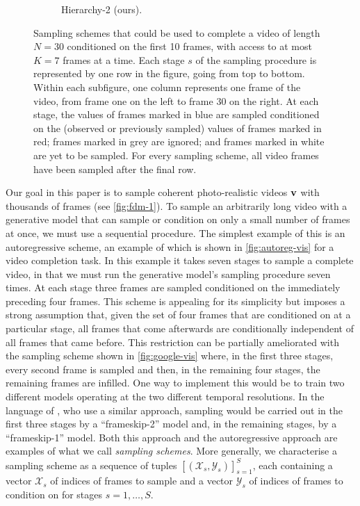 \begin{figure}[t!]
\begin{subfigure}[t]{0.24\textwidth}
        \caption{\footnotesize Hierarchy-2 (ours).} \label{fig:hierarchy-vis}
    \end{subfigure}%
    \caption{Sampling schemes that could be used to complete a video of length $N=30$ conditioned on the first 10 frames, with access to at most $K=7$ frames at a time. Each stage $s$ of the sampling procedure is represented by one row in the figure, going from top to bottom. Within each subfigure, one column represents one frame of the video, from frame one on the left to frame 30 on the right. At each stage, the values of frames marked in blue are sampled conditioned on the (observed or previously sampled) values of frames marked in red; frames marked in grey are ignored; and frames marked in white are yet to be sampled. For every sampling scheme, all video frames have been sampled after the final row.
    }
\end{figure}

Our goal in this paper is to sample coherent photo-realistic videos ${\mathbf{v}}$ with thousands of frames (see \cref{fig:fdm-1}). 
%
To sample an arbitrarily long video with a generative model that can sample or condition on only a small number of frames at once, we must use a sequential procedure. The simplest example of this is an autoregressive scheme, an example of which is shown in \cref{fig:autoreg-vis} for a video completion task. 
%
In this example it takes seven stages to sample a complete video, in that we must run the generative model's sampling procedure seven times. 
%
At each stage three frames are sampled conditioned on the immediately preceding four frames. This scheme is appealing for its simplicity but imposes a strong assumption that, given the set of four frames that are conditioned on at a particular stage, all frames that come afterwards are conditionally independent of all frames that came before. This restriction can be partially ameliorated with the sampling scheme shown in \cref{fig:google-vis} where, in the first three stages, every second frame is sampled and then, in the remaining four stages, the remaining frames are infilled. One way to implement this would be to train two different models operating at the two different temporal resolutions. 
%
In the language of \citet{ho2022video}, who use a similar approach, sampling would be carried out in the first three stages by a ``frameskip-2'' model and, in the remaining stages, by a ``frameskip-1'' model. Both this approach and the autoregressive approach are examples of what we call \textit{sampling schemes}.
%
More generally, we characterise a sampling scheme as a sequence of tuples $[(\mathcal{X}_s, \mathcal{Y}_s)]_{s=1}^S$, each containing a vector $\mathcal{X}_s$ of indices of frames to sample and a vector $\mathcal{Y}_s$ of indices of frames to condition on for stages $s = 1,\ldots,S$. 

